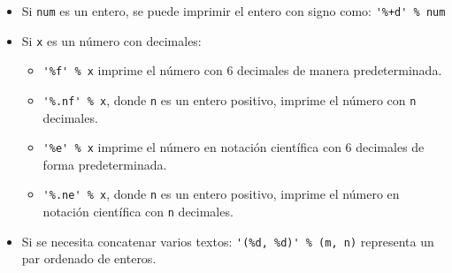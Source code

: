 \documentclass[12pt]{article}
\theoremstyle{definition}
\begin{document}
\begin{itemize}
  \item Si \verb|num| es un entero, se puede imprimir el entero con signo como: \verb|'%+d' % num|
  \item Si \verb|x| es un n\'umero con decimales:
    \begin{itemize}
      \item \verb|'%f' % x| imprime el n\'umero con 6 decimales de manera predeterminada.
      \item \verb|'%.nf' % x|, donde \verb|n| es un entero positivo, imprime el n\'umero con \verb|n| decimales.
      \item \verb|'%e' % x| imprime el n\'umero en notaci\'on cient\'ifica con 6 decimales de forma predeterminada.
      \item \verb|'%.ne' % x|, donde \verb|n| es un entero positivo, imprime el n\'umero en notaci\'on cient\'ifica con \verb|n| decimales.
    \end{itemize}
  \item Si se necesita concatenar varios textos: \verb|'(%d, %d)' % (m, n)| representa un par ordenado de enteros.
\end{itemize}
\end{document}
